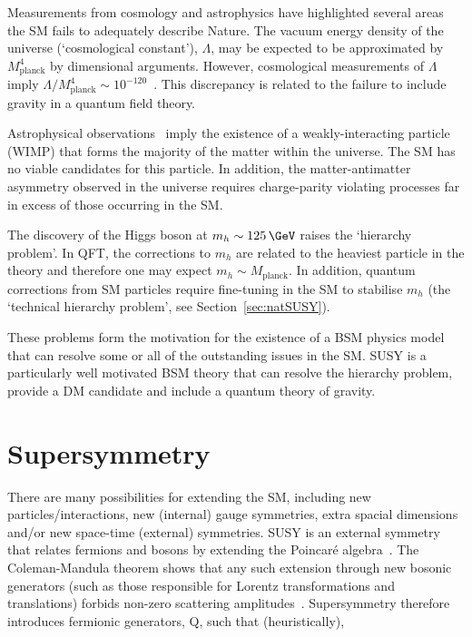 Measurements from cosmology and astrophysics have highlighted several areas
the SM fails to adequately describe Nature. The vacuum energy density 
of the universe (`cosmological constant'), $\Lambda$, 
may be expected to be approximated by $M^4_{\text{planck}}$ by dimensional 
arguments. However, cosmological measurements of $\Lambda$ imply 
$\Lambda/M_{\text{planck}}^4 \sim 10^{-120}$~\cite{cosConst}. This discrepancy
is related to the failure to include gravity in a quantum field theory.

Astrophysical observations~\cite{WIMP} imply the existence 
of a weakly-interacting particle (WIMP) that forms the majority of the matter 
within the universe. The SM has no viable candidates for 
this particle. In addition, the matter-antimatter asymmetry observed in the universe requires 
charge-parity violating processes far in excess of those occurring in the SM.

The discovery of the Higgs boson at $m_{h}\sim125\,\GeV$ raises the `hierarchy problem'. In QFT, 
the corrections to $m_h$ are related to the heaviest particle in the theory and therefore
one may expect $m_h \sim M_{\text{planck}}$. In addition, quantum corrections from SM particles
require fine-tuning in the SM to stabilise $m_h$ (the `technical hierarchy problem', see Section~\ref{sec:natSUSY}).

These problems form the motivation for the existence of a BSM physics model that
can resolve some or all of the outstanding issues in the SM. SUSY is a particularly
well motivated BSM theory that can resolve the hierarchy problem, provide a DM candidate
and include a quantum theory of gravity.

\section{Supersymmetry}

There are many possibilities for extending the SM, 
including new particles/interactions, new (internal) gauge symmetries, 
extra spacial dimensions and/or new space-time (external) symmetries. SUSY is 
an external symmetry that relates fermions and bosons by extending the Poincar\'{e} algebra~\cite{SUSYC}. 
The Coleman-Mandula theorem shows that any such extension through new bosonic generators (such as those responsible for Lorentz 
transformations and translations) forbids non-zero scattering amplitudes~\cite{Coleman}. 
Supersymmetry therefore introduces fermionic generators, Q, such that (heuristically),

